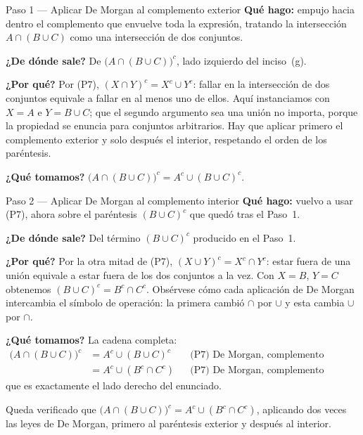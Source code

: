 \documentclass[11pt]{article}
\begin{document}
\begin{paso}{Paso 1 --- Aplicar De Morgan al complemento exterior}
\textbf{Qué hago:} empujo hacia dentro el complemento que envuelve toda la expresión, tratando
la intersección $A\cap(B\cup C)$ como una intersección de dos conjuntos.

\textbf{¿De dónde sale?} De $\bigl(A\cap(B\cup C)\bigr)^{c}$, lado izquierdo del inciso~(g).

\textbf{¿Por qué?} Por (P7), $(X\cap Y)^{c}=X^{c}\cup Y^{c}$: fallar en la intersección de dos
conjuntos equivale a fallar en al menos uno de ellos. Aquí instanciamos con $X=A$ e
$Y=B\cup C$; que el segundo argumento sea una unión no importa, porque la propiedad se enuncia
para conjuntos arbitrarios. Hay que aplicar primero el complemento exterior y solo después el
interior, respetando el orden de los paréntesis.

\textbf{¿Qué tomamos?} $\bigl(A\cap(B\cup C)\bigr)^{c}=A^{c}\cup(B\cup C)^{c}$.
\end{paso}

\begin{paso}{Paso 2 --- Aplicar De Morgan al complemento interior}
\textbf{Qué hago:} vuelvo a usar (P7), ahora sobre el paréntesis $(B\cup C)^{c}$ que quedó tras
el Paso~1.

\textbf{¿De dónde sale?} Del término $(B\cup C)^{c}$ producido en el Paso~1.

\textbf{¿Por qué?} Por la otra mitad de (P7), $(X\cup Y)^{c}=X^{c}\cap Y^{c}$: estar fuera de una
unión equivale a estar fuera de los dos conjuntos a la vez. Con $X=B$, $Y=C$ obtenemos
$(B\cup C)^{c}=B^{c}\cap C^{c}$. Obsérvese cómo cada aplicación de De Morgan intercambia el
símbolo de operación: la primera cambió $\cap$ por $\cup$ y esta cambia $\cup$ por $\cap$.

\textbf{¿Qué tomamos?} La cadena completa:
\begin{align*}
\bigl(A\cap(B\cup C)\bigr)^{c}
&=A^{c}\cup(B\cup C)^{c} && \text{(P7) De Morgan, complemento exterior}\\
&=A^{c}\cup(B^{c}\cap C^{c}) && \text{(P7) De Morgan, complemento interior}
\end{align*}
que es exactamente el lado derecho del enunciado.
\end{paso}

\begin{resp}
Queda verificado que $\bigl(A\cap(B\cup C)\bigr)^{c}=A^{c}\cup(B^{c}\cap C^{c})$, aplicando dos
veces las leyes de De Morgan, primero al paréntesis exterior y después al interior.
\end{resp}
\end{document}
